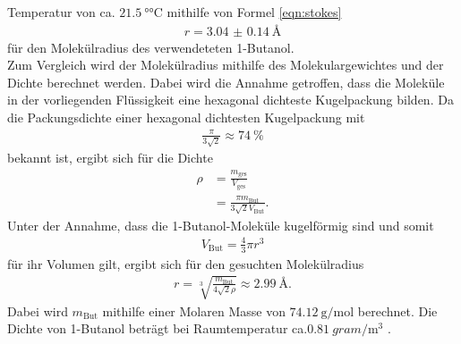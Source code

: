 Temperatur von ca. $\SI{21.5}{\degree\celsius}$
mithilfe von Formel \ref{eqn:stokes} 
\begin{align}
  r = \SI{3.04(014)}{\angstrom}
\end{align}
für den Molekülradius des verwendeteten 1-Butanol. \\
Zum Vergleich wird der Molekülradius mithilfe des Molekulargewichtes und der Dichte berechnet werden. Dabei wird die Annahme getroffen, 
dass die Moleküle in der vorliegenden Flüssigkeit eine hexagonal dichteste Kugelpackung bilden.
Da die Packungsdichte einer hexagonal dichtesten Kugelpackung mit 
\begin{align}
  \frac{\pi}{3\sqrt{2}} \approx \SI{74}{\percent}
\end{align}
bekannt ist, ergibt sich für die Dichte
\begin{align}
  \rho &= \frac{m_\text{ges}}{V_\text{ges}} \\
       &= \frac{\pi m_\text{But}}{3\sqrt{2}V_\text{But}}.
\end{align}
Unter der Annahme, dass die 1-Butanol-Moleküle kugelförmig sind und somit 
\begin{align}
  V_\text{But} = \frac{4}{3} \pi r^3
\end{align}
für ihr Volumen gilt, ergibt sich für den gesuchten Molekülradius
\begin{align}
  r = \sqrt[3]{\frac{m_\text{But}}{4\sqrt{2}\rho}} \approx \SI{2.99}{\angstrom} .
\end{align}
Dabei wird $m_\text{But}$ mithilfe einer Molaren Masse von $\SI{74.12}{\gram\per\mole}$ berechnet. 
Die Dichte von 1-Butanol beträgt bei Raumtemperatur ca.$\SI{0.81}{gram\per\cubic\meter}$ \cite{dichte}.